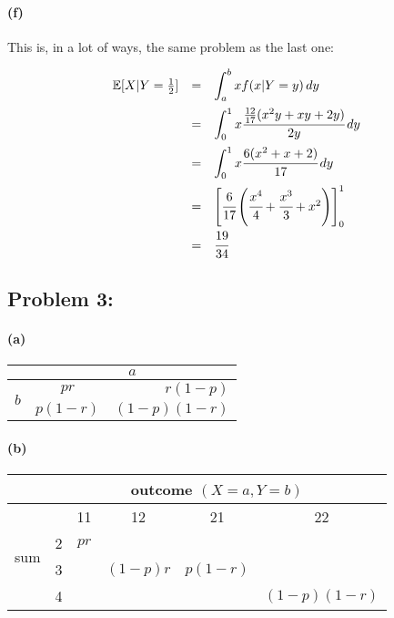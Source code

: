 \documentclass[a4paper]{article}
\begin{document}
\paragraph{(f)} This is, in a lot of ways, the same problem as the last one:

\begin{equation}
\begin{array}{rcl}
\mathbb{E}[X | Y = \frac{1}{2}] & = & \displaystyle\int^{b}_{a} x f(x | Y = y) \,dy \\[.15in]
& = & \displaystyle\int^{1}_{0} x \cfrac{\frac{12}{17} (x^2y + xy + 2y)}{2y} \,dy \\[.15in]
& = & \displaystyle\int^{1}_{0} x \cfrac{6 (x^2 + x + 2)}{17}  \,dy \\[.15in]
& = & \begin{bmatrix} \cfrac{6}{17} \left( \cfrac{x^4}{4} + \cfrac{x^3}{3} + x^2 \right) \end{bmatrix}^{1}_{0} \\[.15in]
& = & \cfrac{19}{34}
\end{array}
\end{equation}

\subsection*{Problem 3:}

\paragraph{(a)}

\renewcommand\arraystretch{1.5}
\begin{tabular}{ c || c | r }
& \multicolumn{2}{c}{$a$} \\
\hline
\hline
\multirow{2}{*}{$b$} & $pr$ & $r(1-p)$ \\
\cline{2-3}
& $p(1-r)$ & $(1-p)(1-r)$ \\
\end{tabular}

\paragraph{(b)}
\renewcommand\arraystretch{1.5}
\begin{tabular}{ c | c | c | c | c | c }
& \multicolumn{5}{c}{outcome $(X = a, Y = b)$} \\
\hline
\multirow{4}{*}{sum} & & 11 & 12 & 21 & 22 \\
\cline{2-6}
& 2 & $pr$ & & & \\
\cline{2-6}
& 3 & & $(1-p)r$ & $p(1-r)$ & \\
\cline{2-6}
& 4 & & & & $(1-p)(1-r)$ \\
\end{tabular}
\end{document}

